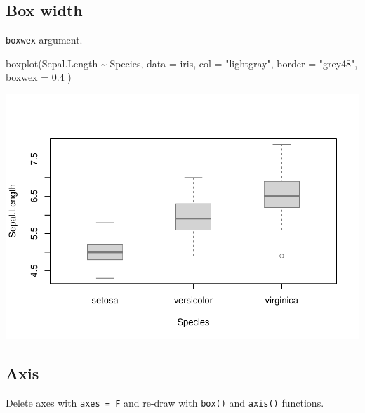 \documentclass[
]{book}
\newenvironment{Shaded}{\begin{snugshade}}{\end{snugshade}}
\newcommand{\AttributeTok}[1]{\textcolor[rgb]{0.77,0.63,0.00}{#1}}
\newcommand{\FloatTok}[1]{\textcolor[rgb]{0.00,0.00,0.81}{#1}}
\newcommand{\FunctionTok}[1]{\textcolor[rgb]{0.00,0.00,0.00}{#1}}
\newcommand{\NormalTok}[1]{#1}
\newcommand{\SpecialCharTok}[1]{\textcolor[rgb]{0.00,0.00,0.00}{#1}}
\newcommand{\StringTok}[1]{\textcolor[rgb]{0.31,0.60,0.02}{#1}}
\begin{document}
\hypertarget{box-width}{%
\subsection{Box width}\label{box-width}}

\texttt{boxwex} argument.

\begin{Shaded}
\begin{Highlighting}[]
\FunctionTok{boxplot}\NormalTok{(Sepal.Length }\SpecialCharTok{\textasciitilde{}}\NormalTok{ Species, }\AttributeTok{data =}\NormalTok{ iris,}
        \AttributeTok{col =} \StringTok{"lightgray"}\NormalTok{, }\AttributeTok{border =} \StringTok{"grey48"}\NormalTok{,}
        \AttributeTok{boxwex =} \FloatTok{0.4}\NormalTok{ )}
\end{Highlighting}
\end{Shaded}

\begin{center}\includegraphics{_main_files/figure-latex/unnamed-chunk-126-1} \end{center}

\hypertarget{axis-1}{%
\subsection{Axis}\label{axis-1}}

Delete axes with \texttt{axes\ =\ F} and re-draw with \texttt{box()} and \texttt{axis()} functions.
\end{document}
